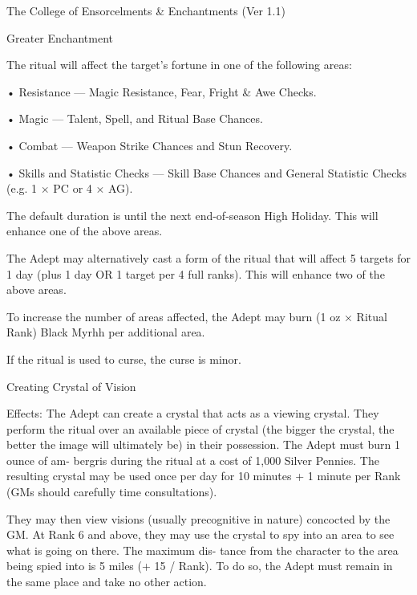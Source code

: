 \begin{Chapter}{The College of Ensorcelments \& Enchantments (Ver 1.1)}
\begin{ritual}[Q-1]{Greater Enchantment}
\begin{effects}
The ritual will affect the target’s fortune in one of 
the following areas:  

•  Resistance  —  Magic  Resistance,  Fear,  Fright  \& 
Awe Checks.  

• Magic — Talent, Spell, and Ritual Base Chances.  

•  Combat  —  Weapon  Strike  Chances  and  Stun 
Recovery.  

• Skills and Statistic Checks — Skill Base Chances 
and  General  Statistic  Checks  (e.g.  1  ×  PC  or  4  × 
AG). 

The default duration is until the next end-of-season High Holiday.
This will enhance one of the above areas.

The Adept may alternatively cast a form of the ritual that will affect
5 targets for 1 day (plus 1 day OR 1 target per 4 full ranks).  This
will enhance two of the above areas.

To increase the number of areas affected, the Adept may burn (1 oz ×
Ritual Rank) Black Myrhh per additional area.

If the ritual is used to curse, the curse is minor.
\end{effects}
\end{ritual}

\begin{ritual}[Q-2]{Creating Crystal of Vision }

Effects: The Adept can create a crystal that acts as 
a  viewing  crystal.  They  perform the  ritual  over  an 
available  piece  of  crystal  (the  bigger  the  crystal, 
the  better  the  image  will  ultimately  be)  in  their 
possession.  The  Adept  must  burn  1  ounce  of  am-
bergris  during  the  ritual  at  a  cost  of  1,000  Silver 
Pennies.  The  resulting  crystal  may  be  used  once 
per day for 10 minutes + 1 minute per Rank (GMs 
should carefully time consultations). 

They  may  then  view  visions  (usually  precognitive 
in  nature)  concocted  by  the  GM.  At  Rank  6  and 
above, they may use the crystal to spy into an area 
to  see  what  is  going  on  there.  The  maximum  dis-
tance  from  the  character  to  the  area  being  spied 
into is 5 miles (+ 15 / Rank). To do so, the Adept 
must  remain  in  the  same  place  and  take  no  other 
action. 


\end{ritual}
\end{Chapter}
